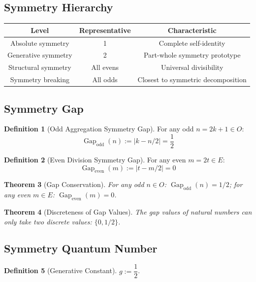 \documentclass[12pt]{article}
\newtheorem{theorem}{Theorem}[section]
\theoremstyle{definition}
\newtheorem{definition}[theorem]{Definition}
\newcommand{\Gap}{\operatorname{Gap}}
\begin{document}
\subsection{Symmetry Hierarchy}

\begin{center}
\begin{tabular}{|c|c|c|}
\hline
\textbf{Level} & \textbf{Representative} & \textbf{Characteristic} \\
\hline
Absolute symmetry & 1 & Complete self-identity \\
Generative symmetry & 2 & Part-whole symmetry prototype \\
Structural symmetry & All evens & Universal divisibility \\
Symmetry breaking & All odds & Closest to symmetric decomposition \\
\hline
\end{tabular}
\end{center}

\subsection{Symmetry Gap}

\begin{definition}[Odd Aggregation Symmetry Gap]
For any odd \(n = 2k+1 \in O\):
\[
\Gap_{\text{odd}}(n) := |k - n/2| = \frac{1}{2}
\]
\end{definition}

\begin{definition}[Even Division Symmetry Gap]
For any even \(m = 2t \in E\):
\[
\Gap_{\text{even}}(m) := |t - m/2| = 0
\]
\end{definition}

\begin{theorem}[Gap Conservation]
For any odd \(n \in O\): \(\Gap_{\text{odd}}(n) = 1/2\); for any even \(m \in E\): \(\Gap_{\text{even}}(m) = 0\).
\end{theorem}

\begin{theorem}[Discreteness of Gap Values]
The gap values of natural numbers can only take two discrete values: \(\{0, 1/2\}\).
\end{theorem}

\subsection{Symmetry Quantum Number}

\begin{definition}[Generative Constant]
\(g := \dfrac{1}{2}\).
\end{definition}
\end{document}
